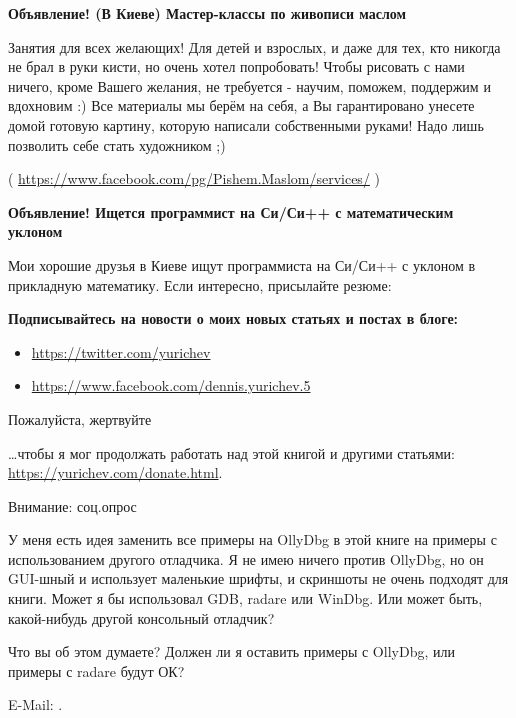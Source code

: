 \vspace*{\fill}

\vspace*{\fill}
\normalsize \textbf{Объявление! (В Киеве) Мастер-классы по живописи маслом}

\bigskip
\bigskip
\bigskip

Занятия для всех желающих! Для детей и взрослых, и даже для тех, кто никогда не брал в руки кисти, но очень хотел попробовать! Чтобы рисовать с нами ничего, кроме Вашего желания, не требуется - научим, поможем, поддержим и вдохновим :) Все материалы мы берём на себя, а Вы гарантировано унесете домой готовую картину, которую написали собственными руками! Надо лишь позволить себе стать художником ;)

( \href{http://link.yurichev.com/45006}{https://www.facebook.com/pg/Pishem.Maslom/services/} )

\bigskip
\bigskip
\bigskip

\normalsize \textbf{Объявление! Ищется программист на Си/Си++ с математическим уклоном}

\bigskip
\bigskip
\bigskip

Мои хорошие друзья в Киеве ищут программиста на Си/Си++ с уклоном в прикладную математику.
Если интересно, присылайте резюме: 

\bigskip
\bigskip
\bigskip

\normalsize \textbf{Подписывайтесь на новости о моих новых статьях и постах в блоге:}

\bigskip
\bigskip
\bigskip

\begin{itemize}

\item \url{https://twitter.com/yurichev}

\item \url{https://www.facebook.com/dennis.yurichev.5}

\end{itemize}

\bigskip
\bigskip
\bigskip
\huge Пожалуйста, жертвуйте
\normalsize

\bigskip
\bigskip
\bigskip

\dots чтобы я мог продолжать работать над этой книгой и другими статьями: \\
\url{https://yurichev.com/donate.html}.

\bigskip
\bigskip
\bigskip

\huge Внимание: соц.опрос
\normalsize

\bigskip
\bigskip
\bigskip

У меня есть идея заменить все примеры на OllyDbg в этой книге на примеры с использованием другого отладчика.
Я не имею ничего против OllyDbg, но он GUI-шный и использует маленькие шрифты, и скриншоты не очень подходят для книги.
Может я бы использовал GDB, radare или WinDbg.
Или может быть, какой-нибудь другой консольный отладчик?

Что вы об этом думаете?
Должен ли я оставить примеры с OllyDbg, или примеры с radare будут ОК?

E-Mail: \GTT{\EMAIL}.

\vspace*{\fill}
\vfill

